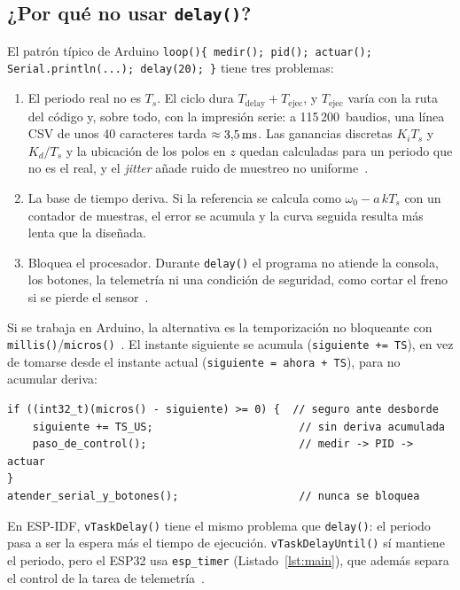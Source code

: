 \subsection{¿Por qué no usar \texttt{delay()}?}
El patrón típico de Arduino \texttt{loop()\{ medir(); pid(); actuar(); Serial.println(...);
delay(20); \}} tiene tres problemas:
\begin{enumerate}
  \item El periodo real no es $T_s$. El ciclo dura $T_\text{delay}+T_\text{ejec}$, y
  $T_\text{ejec}$ varía con la ruta del código y, sobre todo, con la impresión serie: a
  115\,200~baudios, una línea CSV de unos 40 caracteres tarda $\approx3{,}5\,\mathrm{ms}$. Las
  ganancias discretas $K_iT_s$ y $K_d/T_s$ y la ubicación de los polos en $z$ quedan calculadas
  para un periodo que no es el real, y el \emph{jitter} añade ruido de muestreo no
  uniforme~\cite{astrom1997computer}.
  \item La base de tiempo deriva. Si la referencia se calcula como $\omega_0-a\,kT_s$
  con un contador de muestras, el error se acumula y la curva seguida resulta más lenta que
  la diseñada.
  \item Bloquea el procesador. Durante \texttt{delay()} el programa no atiende la
  consola, los botones, la telemetría ni una condición de seguridad, como cortar el freno si se
  pierde el sensor~\cite{arduinoblink}.
\end{enumerate}
Si se trabaja en Arduino, la alternativa es la temporización no bloqueante con
\texttt{millis()}/\texttt{micros()}~\cite{arduinoblink}. El instante siguiente se acumula
(\texttt{siguiente += TS}), en vez de tomarse desde el instante actual
(\texttt{siguiente = ahora + TS}), para no acumular deriva:
\begin{lstlisting}[caption={Patrón no bloqueante equivalente en Arduino.},label={lst:millis},numbers=none]
if ((int32_t)(micros() - siguiente) >= 0) {  // seguro ante desborde
    siguiente += TS_US;                       // sin deriva acumulada
    paso_de_control();                        // medir -> PID -> actuar
}
atender_serial_y_botones();                   // nunca se bloquea
\end{lstlisting}
En ESP-IDF, \texttt{vTaskDelay()} tiene el mismo problema que \texttt{delay()}: el periodo
pasa a ser la espera más el tiempo de ejecución. \texttt{vTaskDelayUntil()} sí mantiene el
periodo, pero el ESP32 usa \texttt{esp\_timer} (Listado~\ref{lst:main}), que además separa el
control de la tarea de telemetría~\cite{espidf}.

